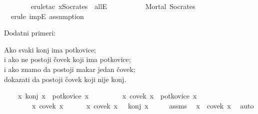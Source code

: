 \begin{isabellebody}
\begin{exercise}[subtitle=Isar dokazi u logici prvog reda.]
\ \ \ \ \ \ \isamarkupfalse%
\ {\isacharparenleft}{\kern0pt}erule{\isacharunderscore}{\kern0pt}tac\ x{\isacharequal}{\kern0pt}{\isachardoublequoteopen}Socrates{\isachardoublequoteclose}\ \ allE{\isacharparenright}{\kern0pt}\isanewline
\ \ \ \ \isamarkupfalse%
\isanewline
\ \ \ \ \isamarkupfalse%
\ {\isachardoublequoteopen}Mortal\ Socrates{\isachardoublequoteclose}\ \isanewline
\ \ \ \ \ \ \isamarkupfalse%
\ {\isacharminus}{\kern0pt}\ {\isacharparenleft}{\kern0pt}erule\ impE{\isacharcomma}{\kern0pt}\ assumption{\isacharparenright}{\kern0pt}\isanewline
\ \ \isamarkupfalse%
\isanewline
{}\isamarkupfalse%
%
\endisatagproof
{\isafoldproof}%
%
\isadelimproof
%
\endisadelimproof
%
\begin{isamarkuptext}%
Dodatni primeri:%
\end{isamarkuptext}\isamarkuptrue%
%
\begin{isamarkuptext}%
Ako svaki konj ima potkovice;\\
      i ako ne postoji čovek koji ima potkovice;\\
      i ako znamo da postoji makar jedan čovek;\\
      dokazati da postoji čovek koji nije konj.%
\end{isamarkuptext}\isamarkuptrue%
\isamarkupfalse%
\isanewline
\ \ \ {\isachardoublequoteopen}{\isasymforall}\ x{\isachardot}{\kern0pt}\ konj\ x\ {\isasymlongrightarrow}\ potkovice\ x{\isachardoublequoteclose}\isanewline
\ \ \ \ \ \ \ {\isachardoublequoteopen}{\isasymnot}\ {\isacharparenleft}{\kern0pt}{\isasymexists}\ x{\isachardot}{\kern0pt}\ covek\ x\ {\isasymand}\ potkovice\ x{\isacharparenright}{\kern0pt}{\isachardoublequoteclose}\isanewline
\ \ \ \ \ \ \ {\isachardoublequoteopen}{\isasymexists}\ x{\isachardot}{\kern0pt}\ covek\ x{\isachardoublequoteclose}\isanewline
\ \ \ \ \ {\isachardoublequoteopen}{\isasymexists}\ x{\isachardot}{\kern0pt}\ covek\ x\ {\isasymand}\ {\isasymnot}\ konj\ x{\isachardoublequoteclose}\isanewline
%
\isadelimproof
%
\endisadelimproof
%
\isatagproof
{}\isamarkupfalse%
\ {\isacharminus}{\kern0pt}\isanewline
\ \ \isamarkupfalse%
\ assms{\isacharparenleft}{\kern0pt}{}{\isacharparenright}{\kern0pt}\ \isamarkupfalse%
\ x\ \ {\isachardoublequoteopen}covek\ x{\isachardoublequoteclose}\ \isamarkupfalse%
\ auto\isanewline

\end{exercise}
\end{isabellebody}
